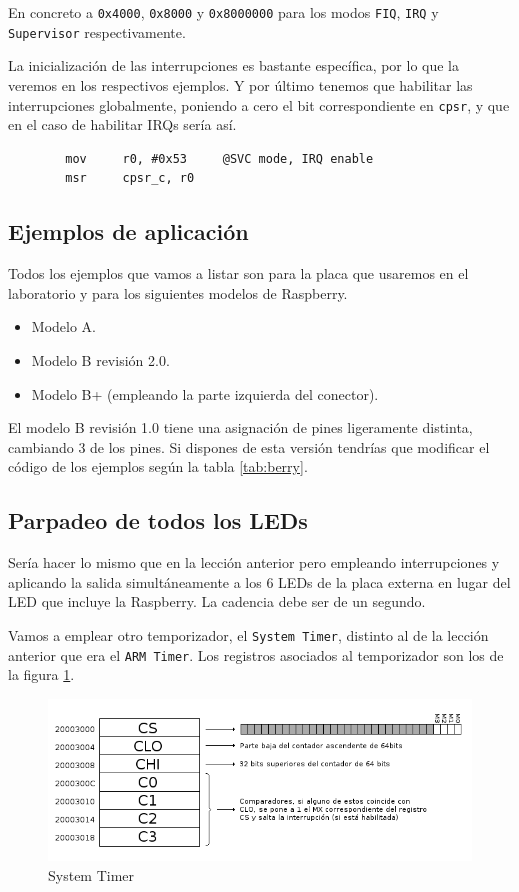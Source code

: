 En concreto a {\tt 0x4000}, {\tt 0x8000} y {\tt 0x8000000} para los modos {\tt FIQ}, {\tt IRQ} y
{\tt Supervisor} respectivamente.

La inicialización de las interrupciones es bastante específica, por lo que la veremos en los
respectivos ejemplos. Y por último tenemos que habilitar las interrupciones globalmente, poniendo
a cero el bit correspondiente en {\tt cpsr}, y que en el caso de habilitar IRQs sería así.

\begin{lstlisting}
        mov     r0, #0x53     @SVC mode, IRQ enable
        msr     cpsr_c, r0
\end{lstlisting}

\subsection{Ejemplos de aplicación}

Todos los ejemplos que vamos a listar son para la placa que usaremos en el laboratorio
y para los siguientes modelos de Raspberry.

\begin{itemize}
  \item Modelo A.
  \item Modelo B revisión 2.0.
  \item Modelo B+ (empleando la parte izquierda del conector).
\end{itemize}

El modelo B revisión 1.0 tiene una asignación de pines ligeramente distinta, cambiando 3 de
los pines. Si dispones de esta versión tendrías que modificar el código de los ejemplos
según la tabla \ref{tab:berry}.

\subsection{Parpadeo de todos los LEDs}

Sería hacer lo mismo que en la lección anterior pero empleando interrupciones y aplicando
la salida simultáneamente a los 6 LEDs de la placa externa en lugar del LED que incluye
la Raspberry. La cadencia debe ser de un segundo.

Vamos a emplear otro temporizador, el {\tt System Timer}, distinto al de la lección anterior
que era el {\tt ARM Timer}. Los registros asociados al temporizador son los de la figura
\ref{fig:systim}.

\begin{figure}[h]
  \centering
    \includegraphics[width=14cm]{graphs/systemtimer.png}
  \caption{System Timer}
  \label{fig:systim}
\end{figure}

